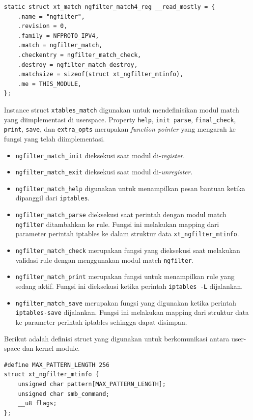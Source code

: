 \begin{lstlisting}
static struct xt_match ngfilter_match4_reg __read_mostly = {
	.name = "ngfilter",
	.revision = 0,
	.family = NFPROTO_IPV4,
	.match = ngfilter_match,
	.checkentry = ngfilter_match_check,
	.destroy = ngfilter_match_destroy,
	.matchsize = sizeof(struct xt_ngfilter_mtinfo),
	.me = THIS_MODULE,
};
\end{lstlisting}

Instance struct \verb|xtables_match| digunakan untuk mendefinisikan modul match yang diimplementasi di userspace.
Property \verb|help|, \verb|init parse|, \verb|final_check|, \verb|print|, \verb|save|, dan \verb|extra_opts| merupakan \textit{function pointer} yang mengarah ke fungsi yang telah diimplementasi.

\begin{itemize}
\item \verb|ngfilter_match_init| dieksekusi saat modul di-\textit{register}.
\item \verb|ngfilter_match_exit| dieksekusi saat modul di-\textit{unregister}.
\item \verb|ngfilter_match_help| digunakan untuk menampilkan pesan bantuan ketika dipanggil dari \verb|iptables|.
\item \verb|ngfilter_match_parse| dieksekusi saat perintah dengan modul match \verb|ngfilter| ditambahkan ke rule. Fungsi ini melakukan mapping dari parameter perintah iptables ke dalam struktur data \verb|xt_ngfilter_mtinfo|.
\item \verb|ngfilter_match_check| merupakan fungsi yang dieksekusi saat melakukan validasi rule dengan menggunakan modul match \verb|ngfilter|.
\item \verb|ngfilter_match_print| merupakan fungsi untuk menampilkan rule yang sedang aktif. Fungsi ini dieksekusi ketika perintah \verb|iptables -L| dijalankan.
\item \verb|ngfilter_match_save| merupakan fungsi yang digunakan ketika perintah \verb|iptables-save| dijalankan. Fungsi ini melakukan mapping dari struktur data ke parameter perintah iptables sehingga dapat disimpan.
\end{itemize}

Berikut adalah definisi struct yang digunakan untuk berkomunikasi antara user-space dan kernel module.

\begin{lstlisting}
#define MAX_PATTERN_LENGTH 256
struct xt_ngfilter_mtinfo {
	unsigned char pattern[MAX_PATTERN_LENGTH];
	unsigned char smb_command;
	__u8 flags;
};
\end{lstlisting}

